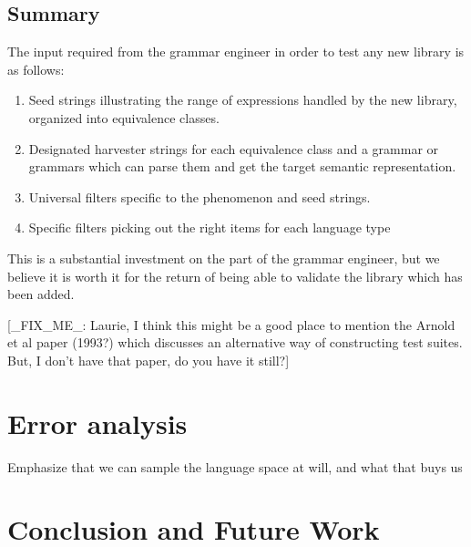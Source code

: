 \documentclass[11pt]{article}
\begin{document}
\subsection{Summary}

The input required from the grammar engineer in order to
test any new library is as follows:

\begin{enumerate}
\item Seed strings illustrating the range of expressions
handled by the new library, organized into equivalence
classes.
\item Designated harvester strings for each equivalence class
and a grammar or grammars which can parse them and get
the target semantic representation.
\item Universal filters specific to the phenomenon and
seed strings.
\item Specific filters picking out the right items for
each language type
\end{enumerate}
%
This is a substantial investment on the part of the grammar
engineer, but we believe it is worth it for the return of
being able to validate the library which has been added.

[\_FIX\_ME\_: Laurie, I think this might be a good place
to mention the Arnold et al paper (1993?) which discusses
an alternative way of constructing test suites.  But, I don't
have that paper, do you have it still?]




\section{Error analysis}
\label{ea}

Emphasize that we can sample the language space at will, and
what that buys us

\section{Conclusion and Future Work}
\end{document}
